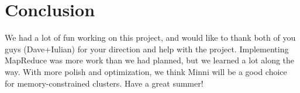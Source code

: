 \documentclass[10pt,letter,final,article,twocolumn]{article} %
\begin{document}
\section{Conclusion}
We had a lot of fun working on this project, and would like to thank both of you guys (Dave+Iulian)
for your direction and help with the project.  Implementing MapReduce was more work than we had planned, but
we learned a lot along the way.  With more polish and optimization, we think Minni will be a good choice for memory-constrained
clusters.  Have a great summer!


{\small

}
\end{document}
